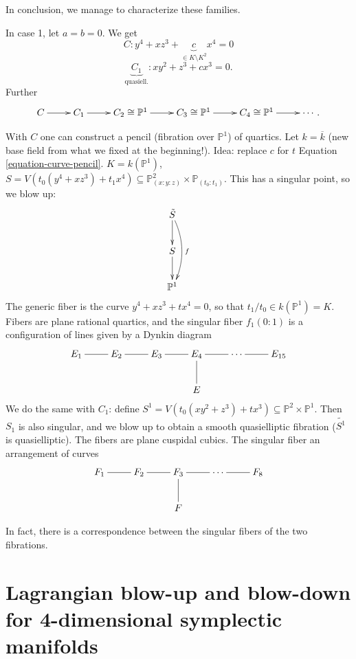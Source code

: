 \noindent
In conclusion, we manage to characterize
these families.

\begin{example}
\label{example-chain-of-maps}
In case 1, let $a=b=0$. We get
\begin{equation}
\label{equation-curve-pencil}
C: y^4+xz^3+\underbrace{c}_{\in K\setminus
K^2}x^4=0
\end{equation}
$$
\underbrace{C_1}_{\text{quasiell.}}:xy^2+z^3+
cx^3=0.
$$
Further
$$
\xymatrix{
C\ar[r]&C_1\ar[r]&C_2 \cong\mathbb{P}^1\ar[r]
&C_3 \cong \mathbb{P}^1\ar[r]&C_4\cong
\mathbb{P}^1\ar[r]&\cdots.
}
$$
\end{example}

\medskip\noindent
With $C$ one can construct a pencil
(fibration over $\mathbb{P}^1$)
of quartics.
Let $k=\overline{k}$ (new base field from
what we fixed at the beginning!).
Idea: replace $c$ for $t$ Equation
\ref{equation-curve-pencil}.
 $K=k(\mathbb{P}^1)$,
 $S=V(t_0(y^4+xz^3)+t_1x^4)
\subseteq \mathbb{P}^2_{(x:y:z)}\times
\mathbb{P}_{(t_0:t_1)}$.
This has a singular point, so we blow up:
$$
\xymatrix{
\tilde{S}\ar[d]\ar@/^1em/[dd]^f\\
S\ar[d]\\\mathbb{P}^1
}
$$
The generic fiber is the curve
$y^4+xz^3+tx^4=0$,
so that $t_1/t_0 \in k(\mathbb{P}^1)=K$.
Fibers are plane rational quartics,
and the singular fiber $f_1(0:1)$ is a
configuration of lines
given by a Dynkin diagram
$$
\xymatrix{
E_1 \ar@{-}[r]& E_2\ar@{-}[r]
& E_3 \ar@{-}[r]& E_4\ar@{-}[d]\ar@{-}[r]
& \cdots \ar@{-}[r]& E_{15}\\
& & & E
}
$$
We do the same with $C_1$: define
$S^1=V(t_0(xy^2+z^3)+tx^3) \subseteq
\mathbb{P}^2 \times \mathbb{P}^1$.
Then $S_1$ is also singular, and we blow up
to obtain a smooth
quasielliptic fibration ($\tilde{S^1}$ is
quasielliptic).
The fibers are plane cuspidal cubics.
The singular fiber an arrangement of curves
$$
\xymatrix{
F_1 \ar@{-}[r]& F_2\ar@{-}[r]&
F_3\ar@{-}[d]\ar@{-}[r]& \cdots \ar@{-}[r]&
F_8\\
& & F
}
$$

In fact, there is a correspondence between
the
singular fibers of the two fibrations.



\section{Lagrangian blow-up and blow-down for
4-dimensional symplectic manifolds
}
\label{section-blow-up-down}


